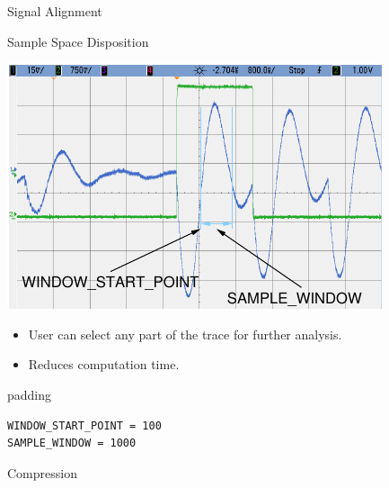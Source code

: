 \documentclass[final]{beamer}
\begin{document}
\begin{frame}[fragile]{}
\begin{columns}[t]
\begin{column}{.31\linewidth}
\begin{block}{Signal Alignment}
\begin{minipage}[t]{0.49\linewidth}
        \end{minipage}
       \end{block}
       \begin{block}{Sample Space Disposition}
        \begin{minipage}[t]{0.49\linewidth}%
          \includegraphics[width=0.9\linewidth]{../figures/oscilloscope-sample-window}
        \end{minipage}%
        \begin{minipage}[t]{0.49\linewidth}%
          \vspace{-6cm}%
          \begin{itemize}
            \item User can select any part of the trace for further analysis.
            \item Reduces computation time.
          \end{itemize} 
          \begin{center}
            \begin{beamercolorbox}[rounded=true]{padding}%
               \footnotesize%
              \begin{lstlisting}
WINDOW_START_POINT = 100
SAMPLE_WINDOW = 1000
              \end{lstlisting}
            \end{beamercolorbox}
          \end{center}
        \end{minipage}
       \end{block}
       \begin{block}{Compression}

\end{block}
\end{column}
\end{columns}
\end{frame}
\end{document}
